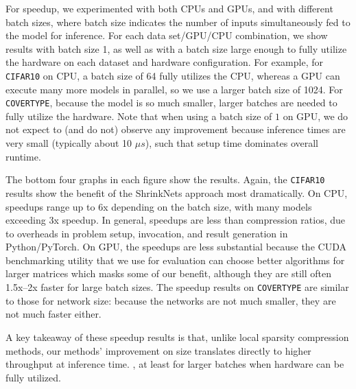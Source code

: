 For speedup, we experimented with both CPUs and GPUs, and with different batch sizes, where batch size indicates the number of inputs simultaneously fed to the model for inference.
For each data set/GPU/CPU combination, we show results with batch size 1, as well as with a batch size large enough to fully utilize the hardware on each dataset and hardware configuration.  For example, for {\tt CIFAR10} on CPU, a batch size of 64 fully utilizes the CPU, whereas a GPU can execute many more models in parallel, so we use a larger batch size of 1024.  For {\tt COVERTYPE}, because the model is so much smaller, larger batches are needed to fully utilize the hardware.
Note that when using a batch size of $1$ on GPU, we do not expect to (and do not) observe any improvement because inference times are very small (typically about 10 $\mu s$), such that setup time dominates overall runtime.  

 The bottom four graphs in each figure 
show the results.  Again, the {\tt CIFAR10} results show the benefit of the ShrinkNets approach
most dramatically.  On CPU, speedups range up to 6x depending on the batch size, with many models exceeding 3x speedup. In general, speedups are less than compression ratios, due to overheads in problem setup, invocation, and result generation  in Python/PyTorch.
  On GPU, the speedups are less substantial because the CUDA benchmarking utility that we use for evaluation can choose better algorithms for larger matrices which masks some of our benefit, although they are still often 1.5x--2x faster for large batch sizes.
The speedup results on {\tt COVERTYPE} are similar to those for network size:  because the networks are not much smaller, they are not much faster either.

A key takeaway of these speedup results is that, unlike local sparsity compression methods, our methods' improvement on size translates directly to higher throughput at inference time. , at least for larger batches when hardware can be fully utilized.





